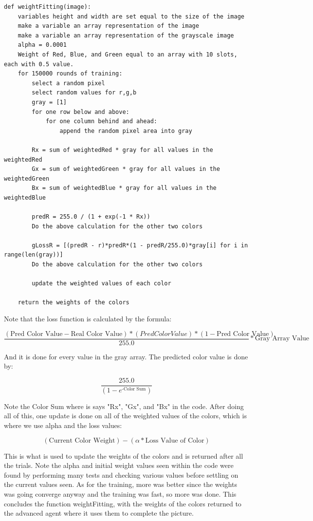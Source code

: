 \documentclass[11pt]{article}
\begin{document}
\begin{verbatim}
def weightFitting(image):
    variables height and width are set equal to the size of the image
    make a variable an array representation of the image
    make a variable an array representation of the grayscale image
    alpha = 0.0001
    Weight of Red, Blue, and Green equal to an array with 10 slots, each with 0.5 value.
    for 150000 rounds of training:
        select a random pixel
        select random values for r,g,b
        gray = [1]
        for one row below and above:
            for one column behind and ahead:
                append the random pixel area into gray

        Rx = sum of weightedRed * gray for all values in the weightedRed
        Gx = sum of weightedGreen * gray for all values in the weightedGreen
        Bx = sum of weightedBlue * gray for all values in the weightedBlue

        predR = 255.0 / (1 + exp(-1 * Rx))
        Do the above calculation for the other two colors

        gLossR = [(predR - r)*predR*(1 - predR/255.0)*gray[i] for i in range(len(gray))]
        Do the above calculation for the other two colors

        update the weighted values of each color

    return the weights of the colors
\end{verbatim}

Note that the loss function is calculated by the formula:

\[
\frac{(\text{Pred Color Value} - \text{Real Color Value})*(Pred Color Value)*(1 - \text{Pred Color Value})}{255.0} * \text{Gray Array Value}
\]

And it is done for every value in the gray array. The predicted color value is done by:

\[
\frac{255.0}{(1 - e^\text{-Color Sum})}
\]

Note the Color Sum where is says "Rx", "Gx", and "Bx" in the code. After doing all of this, one update is done on all of the weighted values of the colors, which is where we use alpha and the loss values:

\[
(\text{Current Color Weight}) - (\alpha * \text{Loss Value of Color})
\]

This is what is used to update the weights of the colors and is returned after all the trials. Note the alpha and initial weight values seen within the code were found by performing many tests and checking various values before settling on the current values seen. As for the training, more was better since the weights was going converge anyway and the training was fast, so more was done. This concludes the function weightFitting, with the weights of the colors returned to the advanced agent where it uses them to complete the picture.
\end{document}
